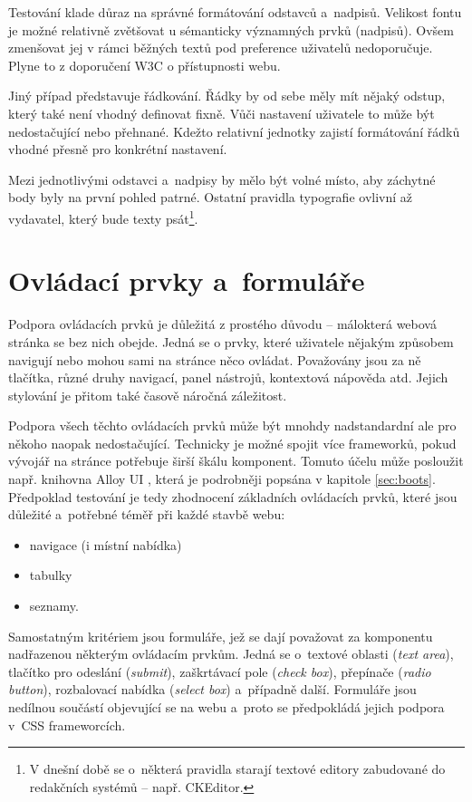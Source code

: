 \documentclass[thesis=B,czech]{FITthesis}[2012/06/26]
\begin{document}
Testování klade důraz na správné formátování odstavců a~nadpisů. Velikost fontu je možné relativně zvětšovat u sémanticky významných prvků (nadpisů). Ovšem zmenšovat jej v rámci běžných textů pod
preference uživatelů nedoporučuje. Plyne to z doporučení W3C o přístupnosti webu.\cite{wcag} 

Jiný případ představuje řádkování. Řádky by od sebe měly mít nějaký odstup, který také není vhodný definovat fixně. Vůči nastavení uživatele to může být nedostačující nebo přehnané. Kdežto relativní jednotky zajistí formátování řádků vhodné přesně pro konkrétní nastavení. 

Mezi jednotlivými odstavci a~nadpisy by mělo být volné místo, aby záchytné body byly na první pohled patrné. Ostatní pravidla typografie ovlivní až vydavatel, který bude texty psát\footnote{V dnešní době se o~některá pravidla starají textové editory zabudované do redakčních systémů -- např. CKEditor.}. 



\section{Ovládací prvky a~formuláře}



Podpora ovládacích prvků je důležitá z prostého důvodu -- málokterá webová stránka se bez nich obejde. Jedná se o prvky, které uživatele nějakým způsobem navigují nebo mohou sami na stránce něco ovládat. Považovány jsou za ně tlačítka, různé druhy navigací, panel nástrojů, kontextová nápověda atd. Jejich stylování je přitom také časově náročná záležitost.  

Podpora všech těchto ovládacích prvků může být mnohdy nadstandardní ale pro někoho naopak nedostačující. Technicky je možné spojit více frameworků, pokud vývojář na stránce potřebuje širší škálu komponent. Tomuto účelu může posloužit např. knihovna Alloy UI , která je podrobněji popsána v kapitole \ref{sec:boots}. Předpoklad testování je tedy zhodnocení základních ovládacích prvků, které jsou důležité a~potřebné téměř při každé stavbě webu:

\begin{itemize}
 \item navigace (i místní nabídka)
 \item tabulky
 \item seznamy.
\end{itemize}

Samostatným kritériem jsou formuláře, jež se dají považovat za komponentu nadřazenou některým ovládacím prvkům. Jedná se o~textové oblasti (\textit{text area}), tlačítko pro odeslání (\textit{submit}), zaškrtávací pole (\textit{check box}), přepínače (\textit{radio button}), rozbalovací nabídka (\textit{select box}) a~případně další. Formuláře jsou nedílnou součástí objevující se na webu a~proto se předpokládá jejich podpora v~CSS frameworcích.
\end{document}
